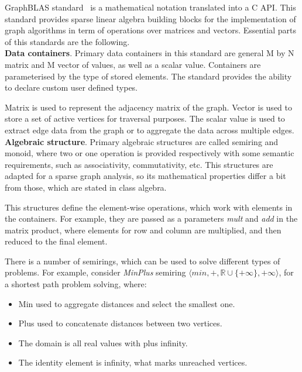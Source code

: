 GraphBLAS standard~\cite{paper:graphblas_foundations} is a mathematical notation translated into a C API. This standard provides sparse linear algebra building blocks for the implementation of graph algorithms in term of operations over matrices and vectors. Essential parts of this standards are the following.\\

\textbf{Data containers}. Primary data containers in this standard are general M by N matrix and M vector of values, as well as a scalar value. Containers are parameterised by the type of stored elements. The standard provides the ability to declare custom user defined types. 

Matrix is used to represent the adjacency matrix of the graph. Vector is used to store a set of active vertices for traversal purposes. The scalar value is used to extract edge data from the graph or to aggregate the data across multiple edges.\\

\textbf{Algebraic structure}. Primary algebraic structures are called semiring and monoid, where two or one operation is provided respectively with some semantic requirements, such as associativity, commutativity, etc. This structures are adapted for a sparse graph analysis, so its mathematical properties differ a bit from those, which are stated in class algebra.

This structures define the element-wise operations, which work with elements in the containers. For example, they are passed as a parameters \textit{mult} and \textit{add} in the matrix product, where elements for row and column are multiplied, and then reduced to the final element.

There is a number of semirings, which can be used to solve different types of problems. For example, consider \textit{MinPlus} semiring $\langle min, +, \mathbb{R} \cup \{+\infty\}, +\infty \rangle$, for a shortest path problem solving, where:

\begin{itemize}
    \item Min used to aggregate distances and select the smallest one.
    \item Plus used to concatenate distances between two vertices.
    \item The domain is all real values with plus infinity.
    \item The identity element is infinity, what marks unreached vertices.
\end{itemize}

